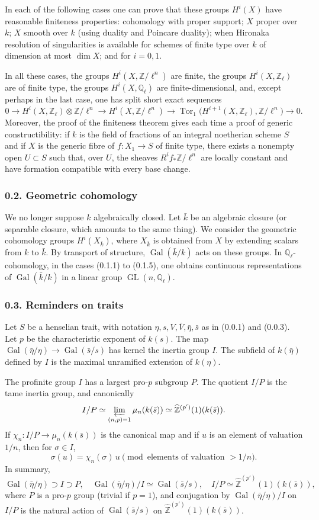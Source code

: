 \documentclass[11pt]{article}
\providecommand{\Gal}{\operatorname{Gal}}
\providecommand{\GL}{\operatorname{GL}}
\providecommand{\Tor}{\operatorname{Tor}}
\providecommand{\Z}{\mathbb Z}
\providecommand{\Ql}{\mathbb Q_\ell}
\providecommand{\Zl}{\mathbb Z_\ell}
\providecommand{\limproj}{\varprojlim}
\begin{document}
In each of the following cases one can prove that these groups $H^i(X)$ have reasonable finiteness properties: cohomology with proper support; $X$ proper over $k$; $X$ smooth over $k$ (using duality and Poincare duality); when Hironaka resolution of singularities is available for schemes of finite type over $k$ of dimension at most $\dim X$; and for $i=0,1$.

In all these cases, the groups $H^i(X,\Z/\ell^n)$ are finite, the groups $H^i(X,\Zl)$ are of finite type, the groups $H^i(X,\Ql)$ are finite-dimensional, and, except perhaps in the last case, one has split short exact sequences
\[
0\to H^i(X,\Zl)\otimes \Z/\ell^n\to H^i(X,\Z/\ell^n)\to
\Tor_1\bigl(H^{i+1}(X,\Zl),\Z/\ell^n\bigr)\to0.
\]
Moreover, the proof of the finiteness theorem gives each time a proof of generic constructibility: if $k$ is the field of fractions of an integral noetherian scheme $S$ and if $X$ is the generic fibre of $f:X_1\to S$ of finite type, there exists a nonempty open $U\subset S$ such that, over $U$, the sheaves $R^if_*\Z/\ell^n$ are locally constant and have formation compatible with every base change.

\subsubsection*{0.2. Geometric cohomology}
We no longer suppose $k$ algebraically closed. Let $\bar k$ be an algebraic closure (or separable closure, which amounts to the same thing). We consider the geometric cohomology groups $H^i(X_{\bar k})$, where $X_{\bar k}$ is obtained from $X$ by extending scalars from $k$ to $\bar k$. By transport of structure, $\Gal(\bar k/k)$ acts on these groups. In $\Ql$-cohomology, in the cases (0.1.1) to (0.1.5), one obtains continuous representations of $\Gal(\bar k/k)$ in a linear group $\GL(n,\Ql)$.

\subsubsection*{0.3. Reminders on traits}
Let $S$ be a henselian trait, with notation $\eta,s,V,\bar V,\bar\eta,\bar s$ as in (0.0.1) and (0.0.3). Let $p$ be the characteristic exponent of $k(s)$. The map $\Gal(\bar\eta/\eta)\to\Gal(\bar s/s)$ has kernel the inertia group $I$. The subfield of $k(\bar\eta)$ defined by $I$ is the maximal unramified extension of $k(\eta)$.

The profinite group $I$ has a largest pro-$p$ subgroup $P$. The quotient $I/P$ is the tame inertia group, and canonically
\[
 I/P\simeq \limproj_{(n,p)=1}\mu_n(k(\bar s))\simeq \widehat{\Z}^{(p')}(1)(k(\bar s)).
\]
If $\chi_n:I/P\to\mu_n(k(\bar s))$ is the canonical map and if $u$ is an element of valuation $1/n$, then for $\sigma\in I$,
\[
 \sigma(u)=\chi_n(\sigma)\,u\pmod{\text{elements of valuation } >1/n}.
\]
In summary,
\[
\Gal(\bar\eta/\eta)\supset I\supset P,
\quad \Gal(\bar\eta/\eta)/I\simeq \Gal(\bar s/s),
\quad I/P\simeq \widehat{\Z}^{(p')}(1)(k(\bar s)),
\]
where $P$ is a pro-$p$ group (trivial if $p=1$), and conjugation by $\Gal(\bar\eta/\eta)/I$ on $I/P$ is the natural action of $\Gal(\bar s/s)$ on $\widehat{\Z}^{(p')}(1)(k(\bar s))$.
\end{document}
